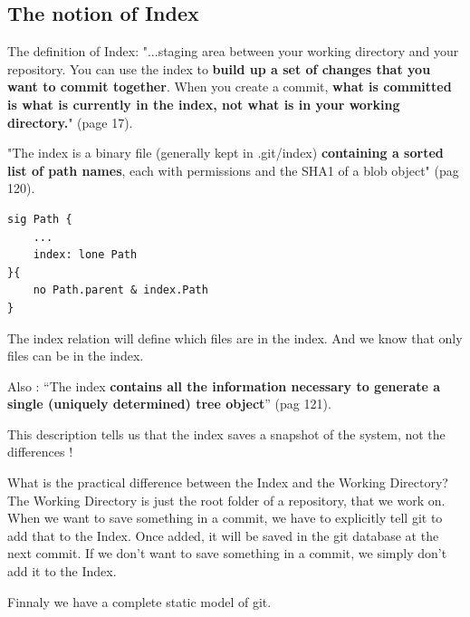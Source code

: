 \subsection{The notion of Index}

The definition of Index:
"...staging area between your working directory and your
repository. You can use the index to {\bf build up a set of 
changes that you want to commit together}. When you create
a commit, {\bf what is committed is what is currently in the
index, not what is in your working directory.}"
\cite{gitComm} (page 17). \par

"The index is a binary file (generally kept in .git/index) 
{\bf containing a sorted list of path names}, each with permissions and the
SHA1 of a blob object" \cite{gitComm} (pag 120). \par 

\begin{lstlisting}
sig Path {
	...
	index: lone Path
}{
	no Path.parent & index.Path
}
\end{lstlisting}

The index relation will define which files are in the index. And we know that only
files can be in the index. \par

Also : ``The index {\bf contains all the information necessary to generate a single
(uniquely determined) tree object}'' \cite{gitComm} (pag 121). \par
This description tells us that the index saves a snapshot of the system,
not the differences !

What is the practical difference between the Index and the Working
Directory? The Working Directory is just the root folder of a repository,
that we work on. When we want to save something in a commit, we have to explicitly 
tell git to add that to the Index. Once added, it
will be saved in the git database at the next commit. If we don't want to save
something in a commit, we simply don't add it to the Index.

Finnaly we have a complete static model of git.

